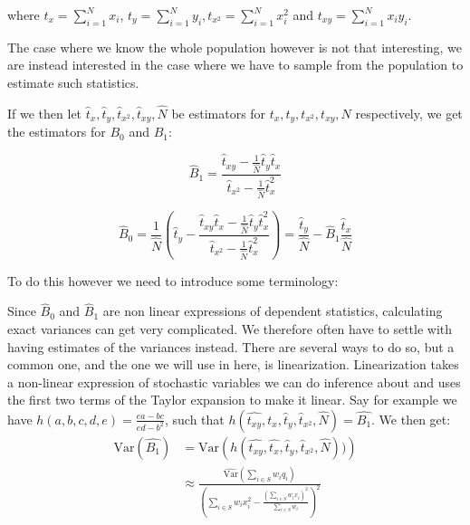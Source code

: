 \documentclass{article}
\begin{document}
where \(t_x = \sum_{i = 1}^N x_i\), \(t_y = \sum_{i = 1}^N y_i, t_{x^2} =
\sum_{i = 1}^N x_i^2\) and \(t_{xy} =
\sum_{i = 1}^N x_i y_i\).


The case where we know the whole population however is not that interesting, we are instead interested in the case where we have to sample from the
population to estimate such statistics.

If we then let \(\hat{t}_x, \hat{t}_y, \hat{t}_{x^2}, \hat{t}_{xy}, \hat{N}\) be estimators
for \(t_x, t_y, t_{x^2},
t_{xy}, N\) respectively, we get the estimators for \(B_0\) and \(B_1\):

\begin{equation*}
  \hat{B}_1 = \frac{\hat{t}_{xy} - \frac{1}{\widehat{N}} \hat{t}_y \hat{t}_x}
    {\hat{t}_{x^2} - \frac{1}{\widehat{N}} \hat{t}_x^2}
\end{equation*}

\begin{equation*}
  \hat{B}_0 = \frac{1}{\widehat{N}} \left( \hat{t}_y - \frac{\hat{t}_{xy} \hat{t}_x - \frac{1}{\widehat{N}} \hat{t}_y \hat{t}_x^2}
    {\hat{t}_{x^2} - \frac{1}{\widehat{N}} \hat{t}_x^2}
  \right)
  = \frac{\hat{t}_y}{\hat{N}} - \hat{B}_1\frac{\hat{t}_x}{\hat{N}}
\end{equation*}

To do this however we need to introduce some terminology:

Since \(\hat{B}_0\) and \(\hat{B}_1\) are non linear expressions of dependent
statistics, calculating exact variances can get very complicated. We therefore
often have to settle with having estimates of the variances instead.
There are several ways to do so, but a common one,
and the one we will use in here, is linearization. Linearization takes a
non-linear expression of stochastic variables we can do inference about and uses
the first two terms of the Taylor expansion to make it linear.
Say for example we have \(h(a, b, c, d, e) = \frac{ea - bc}{ed - b^2}\), such that
\(h(\hat{t_{xy}}, \hat{t_x}, \hat{t}_y, \hat{t}_{x^2}, \hat{N}) = \hat{B_1}\).
We then get:
\begin{align*}
  \mathrm{Var}(\hat{B_1})
  &= \mathrm{Var} \left( h(\hat{t_{xy}}, \hat{t_x},
  \hat{t}_y, \hat{t}_{x^2}, \hat{N})) \right) \\
  &\approx \frac{\widehat{\mathrm{Var}}\left( \sum_{i \in S} w_i q_i \right)}
    {\left( \sum_{i \in S} w_i x_i^2 - \frac{\left( \sum_{i \in S} w_i x_i \right)^2}{\sum_{i \in S} w_i} \right)^2}
\end{align*}
\end{document}
